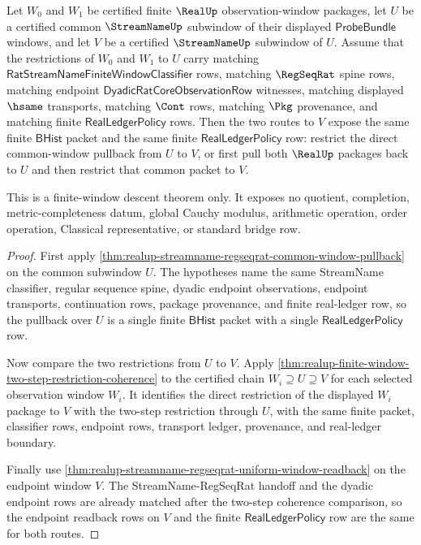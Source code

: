 \begin{theorem}
\label{thm:realup-common-window-pullback-transitive-restriction}
Let $W_0$ and $W_1$ be certified finite $\RealUp$ observation-window packages,
let $U$ be a certified common $\StreamNameUp$ subwindow of their displayed
$\mathsf{ProbeBundle}$ windows, and let $V$ be a certified $\StreamNameUp$
subwindow of $U$. Assume that the restrictions of $W_0$ and $W_1$ to $U$ carry
matching $\mathsf{RatStreamNameFiniteWindowClassifier}$ rows, matching
$\RegSeqRat$ spine rows, matching endpoint
$\mathsf{DyadicRatCoreObservationRow}$ witnesses, matching displayed $\hsame$
transports, matching $\Cont$ rows, matching $\Pkg$ provenance, and matching
finite $\mathsf{RealLedgerPolicy}$ rows. Then the two routes to $V$ expose the
same finite $\mathsf{BHist}$ packet and the same finite
$\mathsf{RealLedgerPolicy}$ row: restrict the direct common-window pullback from
$U$ to $V$, or first pull both $\RealUp$ packages back to $U$ and then restrict
that common packet to $V$.

This is a finite-window descent theorem only. It exposes no quotient,
completion, metric-completeness datum, global Cauchy modulus, arithmetic
operation, order operation, Classical representative, or standard bridge row.
\end{theorem}
\begin{proof}
First apply
\autoref{thm:realup-streamname-regseqrat-common-window-pullback} on the common
subwindow $U$. The hypotheses name the same StreamName classifier, regular
sequence spine, dyadic endpoint observations, endpoint transports, continuation
rows, package provenance, and finite real-ledger row, so the pullback over $U$
is a single finite $\mathsf{BHist}$ packet with a single
$\mathsf{RealLedgerPolicy}$ row.

Now compare the two restrictions from $U$ to $V$. Apply
\autoref{thm:realup-finite-window-two-step-restriction-coherence} to the
certified chain $W_i \supseteq U \supseteq V$ for each selected observation
window $W_i$. It identifies the direct restriction of the displayed
$W_i$ package to $V$ with the two-step restriction through $U$, with the same
finite packet, classifier rows, endpoint rows, transport ledger, provenance,
and real-ledger boundary.

Finally use
\autoref{thm:realup-streamname-regseqrat-uniform-window-readback} on the
endpoint window $V$. The StreamName-RegSeqRat handoff and the dyadic endpoint
rows are already matched after the two-step coherence comparison, so the
endpoint readback rows on $V$ and the finite $\mathsf{RealLedgerPolicy}$ row
are the same for both routes.
\end{proof}

